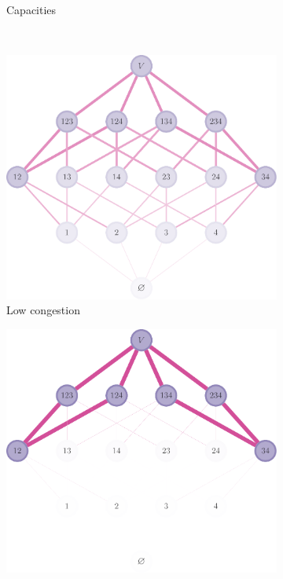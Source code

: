 \begin{figure}[tbp]
\begin{subfigure}[b]{\subflen}
    \caption{Capacities}
    \label{fig:cong2}
  \end{subfigure}\\[2em]
  \begin{subfigure}[b]{\subflen}
    \centering
    \includegraphics[width=\textwidth]{figures/gibbs/cp_easy_cong.pdf}
    \caption{Low congestion}
    \label{fig:cong3}
  \end{subfigure}\hspace{1em}
  \begin{subfigure}[b]{\subflen}
    \centering
    \includegraphics[width=\textwidth]{figures/gibbs/cp_hard_cong.pdf}

\end{subfigure}
\end{figure}
